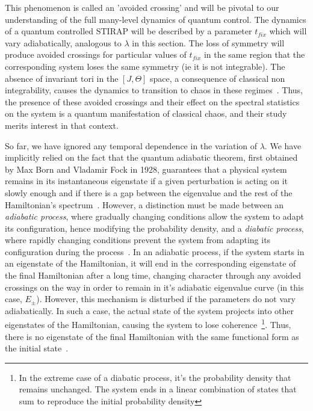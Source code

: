 This phenomenon is called an 'avoided crossing' and will be pivotal to our understanding of the full many-level dynamics of quantum control. The dynamics of a quantum controlled STIRAP will be described by a parameter $t_{fix}$ which will vary adiabatically, analogous to $\lambda$ in this section. The loss of symmetry will produce avoided crossings for particular values of $t_{fix}$ in the same region that the corresponding system loses the same symmetry (ie it is not integrable). The absence of invariant tori in the $\left[J, \Theta \right]$ space, a consequence of classical non integrability, causes the dynamics to transition to chaos in these regimes~\cite{reichl}. Thus, the presence of these avoided crossings and their effect on the spectral statistics on the system is a quantum manifestation of classical chaos, and their study merits interest in that context.

So far, we have ignored any temporal dependence in the variation of $\lambda$. We have implicitly relied on the fact that the quantum adiabatic theorem, first obtained by Max Born and Vladamir Fock in 1928, guarantees that a physical system remains in its instantaneous eigenstate if a given perturbation is acting on it slowly enough and if there is a gap between the eigenvalue and the rest of the Hamiltonian's spectrum~\cite{Born1928:adiabaticthm}. However, a distinction must be made between an \textit{adiabatic process}, where gradually changing conditions allow the system to adapt its configuration, hence modifying the probability density, and a \textit{diabatic process},  where rapidly changing conditions prevent the system from adapting its configuration during the process~\cite{kato:adiabaticthm}. In an adiabatic process, if the system starts in an eigenstate of the Hamiltonian, it will end in the corresponding eigenstate of the final Hamiltonian after a long time, changing character through any avoided crossings on the way in order to remain in it's adiabatic eigenvalue curve (in this case, $E_\pm$). However, this mechanism is disturbed if the parameters do not vary adiabatically. In such a case, the actual state of the system projects into other eigenstates of the Hamiltonian, causing the system to lose coherence~\footnote{In the extreme case of a diabatic process,  it's the probability density that remains unchanged. The system ends in a linear combination of states that sum to reproduce the initial probability density}. Thus, there is no eigenstate of the final Hamiltonian with the same functional form as the initial state~\cite{kato:adiabaticthm}. 

